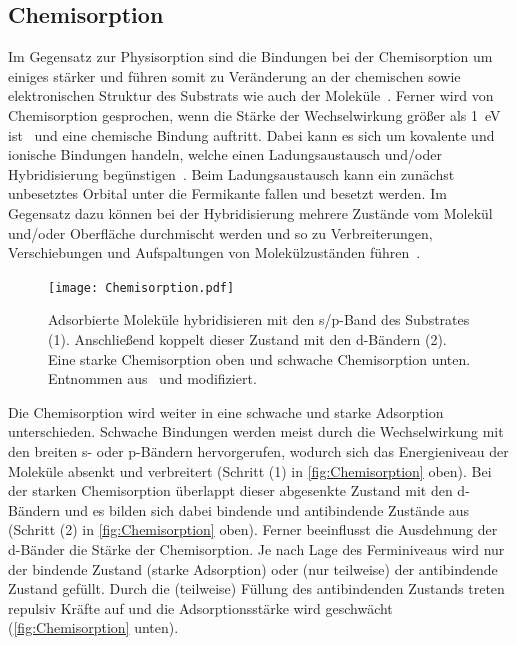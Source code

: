         \subsection{Chemisorption}
            Im Gegensatz zur Physisorption sind die Bindungen bei der Chemisorption um einiges stärker und führen somit zu Veränderung an der chemischen sowie elektronischen Struktur des Substrats wie auch der Moleküle~\cite{bergenti_spinterface_2019}.
            Ferner wird von Chemisorption gesprochen, wenn die Stärke der Wechselwirkung größer als \SI{1}{\electronvolt} ist~\cite{muscat_chemisorption_1978} und eine chemische Bindung auftritt.
            Dabei kann es sich um kovalente und ionische Bindungen handeln, welche einen Ladungsaustausch und/oder Hybridisierung begünstigen~\cite{harutyunyan_hybridisation_2013}.
            Beim Ladungsaustausch kann ein zunächst unbesetztes Orbital unter die Fermikante fallen und besetzt werden.
            Im Gegensatz dazu können bei der Hybridisierung mehrere Zustände vom Molekül und/oder Oberfläche durchmischt werden und so zu Verbreiterungen, Verschiebungen und Aufspaltungen von Molekülzuständen führen~\cite{IF_1}.

            \begin{figure}
                \centering
                \texttt{[image: Chemisorption.pdf]}
                \caption{Adsorbierte Moleküle hybridisieren mit den s/p-Band des Substrates (1).
                Anschließend koppelt dieser Zustand mit den d-Bändern (2).
                Eine starke Chemisorption oben und schwache Chemisorption unten.
                Entnommen aus~\cite{IF_1} und modifiziert.}
                \label{fig:Chemisorption}
            \end{figure}
            Die Chemisorption wird weiter in eine schwache und starke Adsorption unterschieden.
            Schwache Bindungen werden meist durch die Wechselwirkung mit den breiten s- oder p-Bändern hervorgerufen, wodurch sich das Energieniveau der Moleküle absenkt und verbreitert (Schritt (1) in \autoref{fig:Chemisorption} oben).
            Bei der starken Chemisorption überlappt dieser abgesenkte Zustand mit den d-Bändern und es bilden sich dabei bindende und antibindende Zustände aus (Schritt (2) in \autoref{fig:Chemisorption} oben).
            Ferner beeinflusst die Ausdehnung der d-Bänder die Stärke der Chemisorption.
            Je nach Lage des Ferminiveaus wird nur der bindende Zustand (starke Adsorption) oder (nur teilweise) der antibindende Zustand gefüllt.
            Durch die (teilweise) Füllung des antibindenden Zustands treten repulsiv Kräfte auf und die Adsorptionsstärke wird geschwächt (\autoref{fig:Chemisorption} unten).

